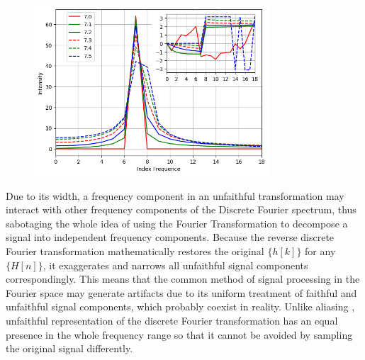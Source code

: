 \documentclass[twoside]{article}
\numberwithin{equation}{section}
\begin{document}
\begin{figure}
\includegraphics[height=2.5in]{FFT_Unfaithful.png} 
\label{fig: FFT_Unfaithful}
\end{figure}

Due to its width, a frequency component in an unfaithful transformation may interact with other frequency components of the Discrete Fourier spectrum, thus sabotaging the whole idea of using the Fourier Transformation to decompose a signal into independent frequency components.  
Because the reverse discrete Fourier transformation mathematically restores the original $\{h[k]\}$ for any $\{H[n]\}$, it exaggerates and narrows all unfaithful signal components correspondingly.  
This means that the common method of signal processing in the Fourier space \cite{Numerical_Recipes}\cite{Stochastic_Arithmetic}\cite{Floating-point_Digital_Filters} may generate artifacts due to its uniform treatment of faithful and unfaithful signal components, which probably coexist in reality.  
Unlike aliasing \cite{Electronics}\cite{Numerical_Recipes}\cite{Floating-point_Digital_Filters}, unfaithful representation of the discrete Fourier transformation has an equal presence in the whole frequency range so that it cannot be avoided by sampling the original signal differently.
\end{document}
